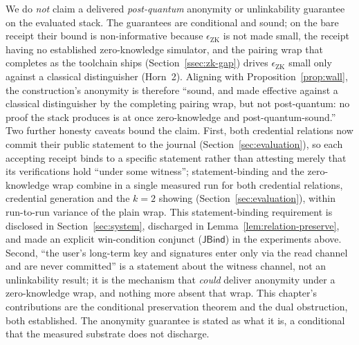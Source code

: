 We do \emph{not} claim a delivered \emph{post-quantum} anonymity or unlinkability guarantee on the evaluated stack. The guarantees are conditional and sound; on the bare receipt their bound is non-informative because $\epsilon_{\mathrm{ZK}}$ is not made small, the receipt having no established zero-knowledge simulator, and the pairing wrap that completes as the toolchain ships (Section~\ref{ssec:zk-gap}) drives $\epsilon_{\mathrm{ZK}}$ small only against a classical distinguisher (Horn~2). Aligning with Proposition~\ref{prop:wall}, the construction's anonymity is therefore ``sound, and made effective against a classical distinguisher by the completing pairing wrap, but not post-quantum: no proof the stack produces is at once zero-knowledge and post-quantum-sound.'' Two further honesty caveats bound the claim. First, both credential relations now commit their public statement to the journal (Section~\ref{sec:evaluation}), so each accepting receipt binds to a specific statement rather than attesting merely that its verifications hold ``under some witness''; statement-binding and the zero-knowledge wrap combine in a single measured run for both credential relations, credential generation and the $k=2$ showing (Section~\ref{sec:evaluation}), within run-to-run variance of the plain wrap. This statement-binding requirement is disclosed in Section~\ref{sec:system}, discharged in Lemma~\ref{lem:relation-preserve}, and made an explicit win-condition conjunct ($\mathsf{JBind}$) in the experiments above. Second, ``the user's long-term key and signatures enter only via the read channel and are never committed'' is a statement about the witness channel, not an unlinkability result; it is the mechanism that \emph{could} deliver anonymity under a zero-knowledge wrap, and nothing more absent that wrap. This chapter's contributions are the conditional preservation theorem and the dual obstruction, both established. The anonymity guarantee is stated as what it is, a conditional that the measured substrate does not discharge.

